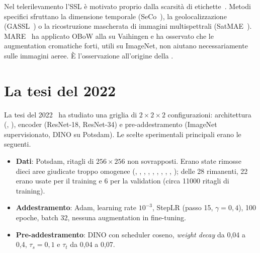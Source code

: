 Nel telerilevamento l'SSL è motivato proprio dalla scarsità di etichette~\cite{wang2022ssl_rs}.
Metodi specifici sfruttano la dimensione temporale (SeCo~\cite{manas2021seco}), la
geolocalizzazione (GASSL~\cite{ayush2021gassl}) o la ricostruzione mascherata di immagini
multispettrali (SatMAE~\cite{cong2022satmae}). MARE~\cite{marsocci2021mare} ha applicato OBoW
alla \maresunet{} su Vaihingen e ha osservato che le augmentation cromatiche forti, utili su
ImageNet, non aiutano necessariamente sulle immagini aeree. È l'osservazione all'origine della
.

\section{La tesi del 2022}
\label{sec:tesi-2022}

La tesi del 2022~\cite{campana2022tesi} ha studiato una griglia di $2\times2\times2$
configurazioni: architettura (\maresunet{}, \maresunetvq{}), encoder (ResNet-18, ResNet-34) e
pre-addestramento (ImageNet supervisionato, DINO su Potsdam). Le scelte sperimentali principali
erano le seguenti.

\begin{itemize}
  \item \textbf{Dati}: Potsdam, ritagli di $256\times256$ non sovrapposti. Erano state rimosse
  dieci aree giudicate troppo omogenee (, , , ,
  , , , , , ); delle 28
  rimanenti, 22 erano usate per il training e 6 per la validation (circa \num{11000} ritagli di
  training).
  \item \textbf{Addestramento}: Adam, learning rate $10^{-3}$, StepLR (passo 15, $\gamma=0{,}4$),
  100 epoche, batch 32, nessuna augmentation in fine-tuning.
  \item \textbf{Pre-addestramento}: DINO con scheduler coseno, \emph{weight decay} da 0,04 a 0,4,
  $\tau_s=0{,}1$ e $\tau_t$ da 0,04 a 0,07.
\end{itemize}

